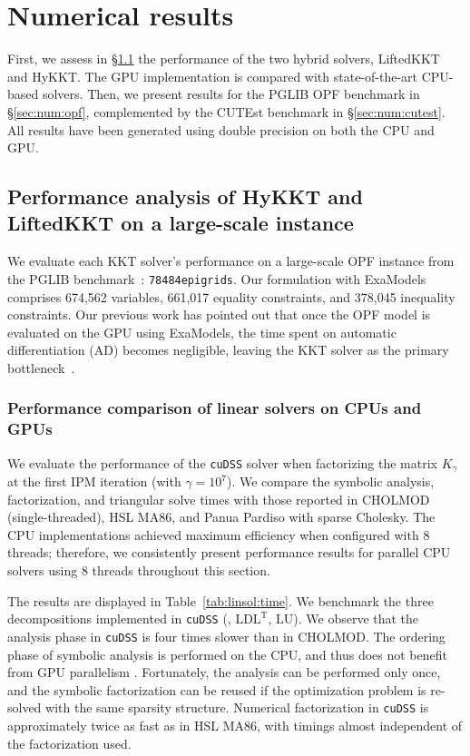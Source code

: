 \documentclass[smallextended]{svjour3}
\newcommand{\ldlt}{$\mathrm{LDL^T}$\xspace}
\newcommand{\llt}{\text{Cholesky}\xspace}
\newcommand{\lu}{$\mathrm{LU}$\xspace}
\newcommand{\add}[1]{#1}
\begin{document}
\section{Numerical results}
First, we assess in \S\ref{sec:num:pprof} the performance of the two hybrid solvers, LiftedKKT and HyKKT.
The GPU implementation is compared with state-of-the-art CPU-based solvers.
Then, we present results for the PGLIB OPF benchmark in \S\ref{sec:num:opf},
 complemented by the CUTEst benchmark in \S\ref{sec:num:cutest}.
\add{All results have been generated using double precision on both the CPU and GPU.}


\subsection{Performance analysis of HyKKT and LiftedKKT on a large-scale instance}
\label{sec:num:pprof}
We evaluate each KKT solver's performance on a large-scale OPF instance from
the PGLIB benchmark~\cite{babaeinejadsarookolaee2019power}: {\tt 78484epigrids}.
Our formulation with ExaModels comprises 674,562 variables, 661,017 equality constraints, and 378,045 inequality constraints.
Our previous work has pointed out that once the OPF model is evaluated
on the GPU using ExaModels, the time spent on automatic differentiation (AD) becomes negligible, leaving
the KKT solver as the primary bottleneck~\cite{shin2023accelerating}.


\subsubsection{Performance comparison of linear solvers on CPUs and GPUs}
We evaluate the performance of the {\tt cuDSS} solver when
factorizing the matrix $K_{\gamma}$ at the first IPM iteration (with
$\gamma = 10^7$). We compare the symbolic analysis,
factorization, and triangular solve times with those reported in CHOLMOD
(single-threaded), HSL MA86, and Panua Pardiso with sparse Cholesky.
The CPU implementations achieved maximum efficiency when configured with 8 threads;
therefore, we consistently present performance results
for parallel CPU solvers using 8 threads throughout this section.

The results are displayed in Table~\ref{tab:linsol:time}.
We benchmark the three decompositions implemented in {\tt cuDSS} (\llt, \ldlt, \lu).
We observe that the analysis phase in {\tt cuDSS} is four times slower than in CHOLMOD.
The ordering phase of symbolic analysis is performed on the CPU, and thus does not benefit from GPU parallelism \cite{nvidiaNVIDIACuDSSPreview}. Fortunately, the analysis can be performed only once, and the symbolic factorization can be reused if the optimization problem is re-solved with the same sparsity structure.
Numerical factorization in {\tt cuDSS} is approximately twice as fast as in HSL MA86, with timings almost independent of the factorization used.
\end{document}

